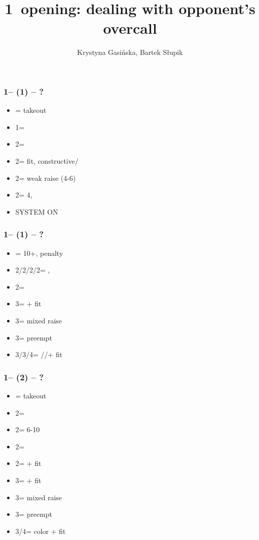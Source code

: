\documentclass[12pt, a4paper]{article}
\title{1\hearts\ opening: dealing with opponent's overcall}
\author{Krystyna Gasińska, Bartek Słupik}
\begin{document}
\maketitle


\subsubsection*{1\hearts -- (1\spades) -- ?}
\begin{itemize}
    \item \dbl = takeout
    \item 1\nt = \clubs
    \item 2\clubs = \diams
    \item 2\diams = fit, constructive/\gf
    \item 2\hearts = weak raise (4-6)
    \item 2\spades = 4\hearts, \inv
    \item \small{SYSTEM ON}
\end{itemize}

\subsubsection*{1\hearts -- (1\nt) -- ?}
\begin{itemize}
    \item \dbl = 10+, penalty
    \item 2\clubs/2\diams/2\hearts/2\spades = \nat, \nf
    \item 2\nt = \minor
    \item 3\clubs = \inv + fit
    \item 3\diams = mixed raise
    \item 3\hearts = preempt
    \item 3\spades/3\nt/4\clubs = \spades/\diams/\clubs + fit
\end{itemize}

\subsubsection*{1\hearts -- (2\clubs) -- ?}
\begin{itemize}
    \item \dbl = takeout
    \item 2\diams = \fonce
    \item 2\hearts = 6-10
    \item 2\spades = \fonce
    \item 2\nt = \gf + fit
    \item 3\clubs = \inv + fit
    \item 3\diams = mixed raise
    \item 3\hearts = preempt
    \item 3\spades/4\diams = color + fit
\end{itemize}
\end{document}
